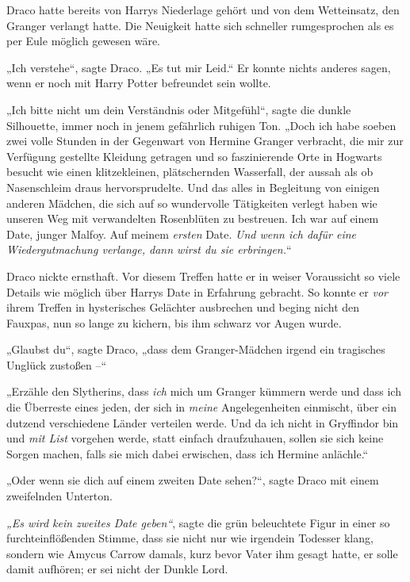 Draco hatte bereits von Harrys Niederlage gehört und von dem Wetteinsatz, den Granger verlangt hatte. Die Neuigkeit hatte sich schneller rumgesprochen als es per Eule möglich gewesen wäre. 

„Ich verstehe“, sagte Draco. „Es tut mir Leid.“ Er konnte nichts anderes sagen, wenn er noch mit Harry Potter befreundet sein wollte. 

„Ich bitte nicht um dein Verständnis oder Mitgefühl“, sagte die dunkle Silhouette, immer noch in jenem gefährlich ruhigen Ton. „Doch ich habe soeben zwei volle Stunden in der Gegenwart von Hermine Granger verbracht, die mir zur Verfügung gestellte Kleidung getragen und so faszinierende Orte in Hogwarts besucht wie einen klitzekleinen, plätschernden Wasserfall, der aussah als ob Nasenschleim draus hervorsprudelte. Und das alles in Begleitung von einigen anderen Mädchen, die sich auf so wundervolle Tätigkeiten verlegt haben wie unseren Weg mit verwandelten Rosenblüten zu bestreuen. Ich war auf einem Date, junger Malfoy. Auf meinem \emph{ersten} Date. \emph{Und wenn ich dafür eine Wiedergutmachung verlange, dann wirst du sie erbringen.}“ 

Draco nickte ernsthaft. Vor diesem Treffen hatte er in weiser Voraussicht so viele Details wie möglich über Harrys Date in Erfahrung gebracht. So konnte er \emph{vor} ihrem Treffen in hysterisches Gelächter ausbrechen und beging nicht den Fauxpas, nun so lange zu kichern, bis ihm schwarz vor Augen wurde. 

„Glaubst du“, sagte Draco, „dass dem Granger-Mädchen irgend ein tragisches Unglück zustoßen –“ 

„Erzähle den Slytherins, dass \emph{ich} mich um Granger kümmern werde und dass ich die Überreste eines jeden, der sich in \emph{meine} Angelegenheiten einmischt, über ein dutzend verschiedene Länder verteilen werde. Und da ich nicht in Gryffindor bin und \emph{mit List} vorgehen werde, statt einfach draufzuhauen, sollen sie sich keine Sorgen machen, falls sie mich dabei erwischen, dass ich Hermine anlächle.“ 

„Oder wenn sie dich auf einem zweiten Date sehen?“, sagte Draco mit einem zweifelnden Unterton. 

\emph{„Es wird kein zweites Date geben“}, sagte die grün beleuchtete Figur in einer so furchteinflößenden Stimme, dass sie nicht nur wie irgendein Todesser klang, sondern wie Amycus Carrow damals, kurz bevor Vater ihm gesagt hatte, er solle damit aufhören; er sei nicht der Dunkle Lord. 

